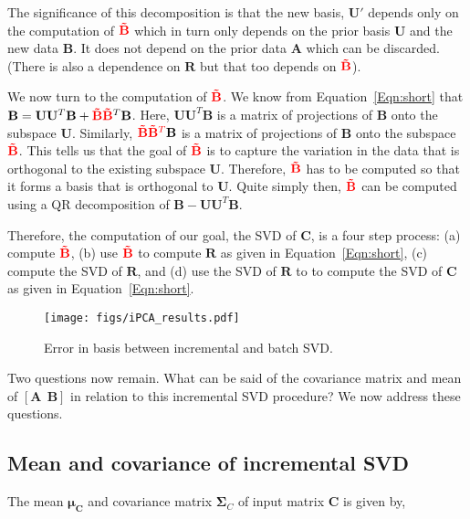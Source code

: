 The significance of this decomposition is that the new basis, $\mathbf{U'}$ depends only on the computation of ${\color{red}\mathbf{\tilde{B}}}$ which in turn only depends on the prior basis $\mathbf{U}$ and the new data  $\mathbf{B}$.  It does not depend on the prior data $\mathbf{A}$ which can be discarded.  (There is also a dependence on $\mathbf{R}$ but that too depends on ${\color{red}\mathbf{\tilde{B}}}$).

We now turn to the computation of $ {\color{red}\mathbf{\tilde{B}}}$.  We know from Equation~\ref{Eqn:short} that $\mathbf{B}=\mathbf{U}\mathbf{U}^T\mathbf{B} + {\color{red}\mathbf{\tilde{B}}} {{\color{red}\mathbf{\tilde{B}}}^T}\mathbf{B}$.  Here, $\mathbf{U}\mathbf{U}^T\mathbf{B}$ is a matrix of projections of $\mathbf{B}$ onto the subspace $\mathbf{U}$.  Similarly, ${\color{red}\mathbf{\tilde{B}}} {\color{red}\mathbf{\tilde{B}}^T}\mathbf{B}$ is a matrix of projections of $\mathbf{B}$ onto the subspace ${\color{red}\mathbf{\tilde{B}}}$.  This tells us that the goal of ${\color{red}\mathbf{\tilde{B}}}$ is to capture the variation in the data that is orthogonal to the existing subspace $\mathbf{U}$.  Therefore, ${\color{red}\mathbf{\tilde{B}}}$ has to be computed so that it forms a basis that is orthogonal to $\mathbf{U}$.  Quite simply then, ${\color{red}\mathbf{\tilde{B}}}$ can be computed using a QR decomposition of $\mathbf{B}-\mathbf{U}\mathbf{U}^T\mathbf{B}$. 

Therefore, the computation of our goal, the SVD of $\mathbf{C}$, is a four step process: (a) compute ${\color{red}\mathbf{\tilde{B}}}$, (b) use ${\color{red}\mathbf{\tilde{B}}}$ to compute $\mathbf{R}$ as given in Equation~\ref{Eqn:short}, (c) compute the SVD of $\mathbf{R}$, and (d) use the SVD of $\mathbf{R}$ to to compute the SVD of $\mathbf{C}$ as given in Equation~\ref{Eqn:short}.  

								\begin{figure}[t]
								\centering
								\texttt{[image: figs/iPCA\_results.pdf]}
								\caption{Error in basis between incremental and batch SVD.}
								\label{iPCA_results}
								\end{figure}

Two questions now remain.  What can be said of the covariance matrix and mean of $\left[{\mathbf{A}} \ \ \mathbf{B}\right]$ in relation to this incremental SVD procedure?  We now address these questions.


\subsection{Mean and covariance of incremental SVD}
The mean $\mathbf{\mu}_\mathbf{C}$ and covariance matrix $\mathbf{\Sigma}_C$ of input matrix $\mathbf{C}$ is given by,

